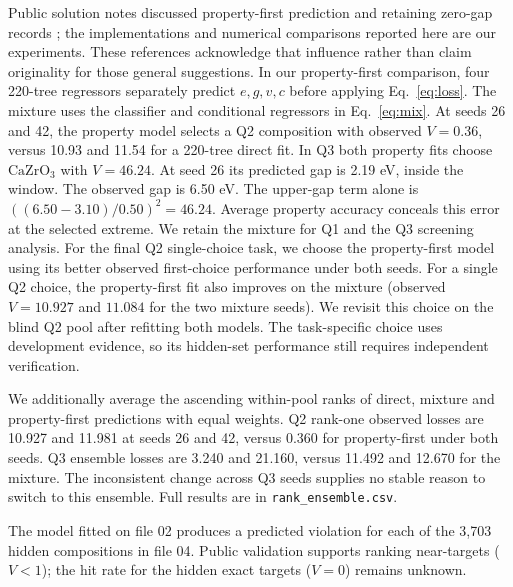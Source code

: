 Public solution notes discussed property-first prediction and retaining zero-gap records \cite{note1,note2}; the implementations and numerical comparisons reported here are our experiments. These references acknowledge that influence rather than claim originality for those general suggestions. In our property-first comparison, four 220-tree regressors separately predict $e,g,v,c$ before applying Eq.~\eqref{eq:loss}. The mixture uses the classifier and conditional regressors in Eq.~\eqref{eq:mix}. At seeds 26 and 42, the property model selects a Q2 composition with observed $V=0.36$, versus 10.93 and 11.54 for a 220-tree direct fit. In Q3 both property fits choose $\mathrm{CaZrO_3}$ with $V=46.24$. At seed 26 its predicted gap is 2.19 eV, inside the window. The observed gap is 6.50 eV. The upper-gap term alone is $((6.50-3.10)/0.50)^2=46.24$. Average property accuracy conceals this error at the selected extreme. We retain the mixture for Q1 and the Q3 screening analysis. For the final Q2 single-choice task, we choose the property-first model using its better observed first-choice performance under both seeds. For a single Q2 choice, the property-first fit also improves on the mixture (observed $V=10.927$ and $11.084$ for the two mixture seeds). We revisit this choice on the blind Q2 pool after refitting both models. The task-specific choice uses development evidence, so its hidden-set performance still requires independent verification.

We additionally average the ascending within-pool ranks of direct, mixture and property-first predictions with equal weights. Q2 rank-one observed losses are 10.927 and 11.981 at seeds 26 and 42, versus 0.360 for property-first under both seeds. Q3 ensemble losses are 3.240 and 21.160, versus 11.492 and 12.670 for the mixture. The inconsistent change across Q3 seeds supplies no stable reason to switch to this ensemble. Full results are in \texttt{rank\_ensemble.csv}.


The model fitted on file 02 produces a predicted violation for each of the 3,703 hidden compositions in file 04. Public validation supports ranking near-targets ($V<1$); the hit rate for the hidden exact targets ($V=0$) remains unknown.


